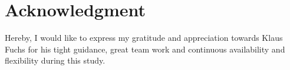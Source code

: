 \chapter*{Acknowledgment}
Hereby, I would like to express my gratitude and appreciation towards Klaus Fuchs for his tight guidance, great team work and continuous availability and flexibility during this study.